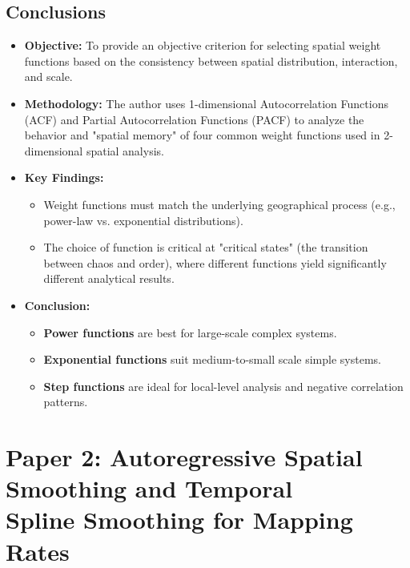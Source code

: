 \documentclass[10pt, oneside]{article}
\begin{document}
\subsection*{Conclusions}
\begin{itemize}
	\item \textbf{Objective:} To provide an objective criterion for selecting spatial weight functions based on the
	      consistency between spatial distribution, interaction, and scale.
	\item \textbf{Methodology:} The author uses 1-dimensional Autocorrelation Functions (ACF) and Partial Autocorrelation
	      Functions (PACF) to analyze the behavior and "spatial memory" of four common weight functions used in
	      2-dimensional spatial analysis.
	\item \textbf{Key Findings:}
	      \begin{itemize}
		      \item Weight functions must match the underlying geographical process (e.g., power-law vs. exponential distributions).
		      \item The choice of function is critical at "critical states" (the transition between chaos and order), where different
		            functions yield significantly different analytical results.
	      \end{itemize}
	\item \textbf{Conclusion:}
	      \begin{itemize}
		      \item \textbf{Power functions} are best for large-scale complex systems.
		      \item \textbf{Exponential functions} suit medium-to-small scale simple systems.
		      \item \textbf{Step functions} are ideal for local-level analysis and negative correlation patterns.
	      \end{itemize}
\end{itemize}

\section*{Paper 2: Autoregressive Spatial Smoothing and Temporal \\Spline Smoothing for Mapping Rates}
\end{document}
